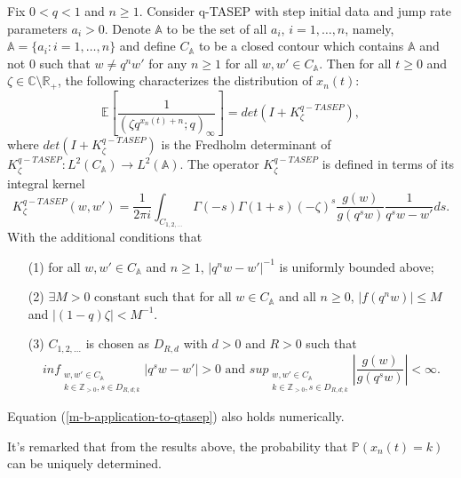 \begin{theorem}
Fix $0 < q < 1$ and $n \ge 1$. Consider q-TASEP with step initial data and jump rate parameters $a_i > 0$. Denote $\mathbb{A}$ to be the set of all $a_i$, $i = 1, \dots, n$, namely, $\mathbb{A} = \{a_i: i = 1, \dots, n\}$ and define $C_{\mathbb{A}}$ to be a closed contour which contains $\mathbb{A}$ and not $0$ such that $w \neq q^n w'$ for any $n \ge 1$ for all $w, w' \in C_{\mathbb{A}}$. Then for all $t \ge 0$ and $\zeta \in \mathbb{C} \setminus \mathbb{R}_+$, the following characterizes the distribution of $x_n(t)$:
\begin{equation}
\label{m-b-application-to-qtasep}
\mathbb{E} \left[ \frac{1}{(\zeta q^{x_n(t)+n}; q)_{\infty}} \right] = det(I+K_{\zeta}^{q-TASEP}),
\end{equation}
where $det(I+K_{\zeta}^{q-TASEP})$ is the Fredholm determinant of $K_{\zeta}^{q-TASEP}: L^2(C_{\mathbb{A}}) \rightarrow L^2(\mathbb{A})$. The operator $K_{\zeta}^{q-TASEP}$ is defined in terms of its integral kernel
$$K_{\zeta}^{q-TASEP}(w,w') = \frac{1}{2 \pi i} \int_{C_{1,2,\dots}} \Gamma(-s) \Gamma(1+s) (-\zeta)^s \frac{g(w)}{g(q^sw)} \frac{1}{q^sw - w'} ds.$$
With the additional conditions that
\begin{enumerate}
\item[(1)] for all $w, w' \in C_{\mathbb{A}}$ and $n \ge 1$, $|q^n w - w'|^{-1}$ is uniformly bounded above;
\item[(2)] $\exists M > 0$ constant such that for all $w \in C_{\mathbb{A}}$ and all $n \ge 0$, $|f(q^n w)| \le M$ and $|(1-q) \zeta| < M^{-1}$.
\item[(3)] $C_{1,2,\dots}$ is chosen as $D_{R,d}$ with $d > 0$ and $R > 0$ such that $$ inf_{\substack{ {w, w' \in C_{\mathbb{A}}} \\ {k \in \mathbb{Z}_{>0}, s \in D_{R, d;k}} }} |q^sw - w'| > 0 \text{ and } sup_{\substack{ {w,w' \in C_{\mathbb{A}}} \\ {k \in \mathbb{Z}_{>0}, s \in D_{R,d;k}} }} \left| \frac{g(w)}{g(q^s w)} \right| < \infty.$$
\end{enumerate}
Equation (\ref{m-b-application-to-qtasep}) also holds numerically.
\end{theorem}

\begin{remark}
It's remarked that from the results above, the probability that $\mathbb{P}(x_n(t) = k)$ can be uniquely determined.
\end{remark}

